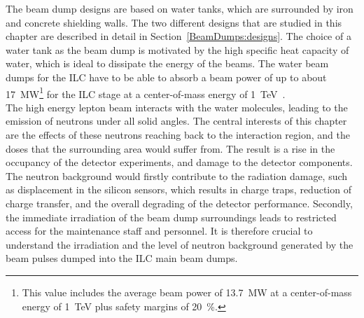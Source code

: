 The beam dump designs are based on water tanks, which are surrounded by iron and concrete shielding walls. 
The two different designs that are studied in this chapter are described in detail in Section~\ref{BeamDumps:designs}.
The choice of a water tank as the beam dump is motivated by the high specific heat capacity of water, which is ideal to dissipate the energy of the beams. 
The water beam dumps for the ILC have to be able to absorb a beam power of up to about \SI{17}{\mega\watt}\footnote{This value includes the average beam power of \SI{13.7}{\mega\watt} at a center-of-mass energy of \SI{1}{\TeV} plus safety margins of \SI{20}{\percent}.} for the ILC stage at a center-of-mass energy of \SI{1}{\TeV}~\cite{BeamDumpSpecs}.
\\The high energy lepton beam interacts with the water molecules, leading to the emission of neutrons under all solid angles. 
The central interests of this chapter are the effects of these neutrons reaching back to the interaction region, and the doses that the surrounding area would suffer from. 
The result is a rise in the occupancy of the detector experiments, and damage to the detector components.
The neutron background would firstly contribute to the radiation damage, such as displacement in the silicon sensors, which results in charge traps, reduction of charge transfer, and the overall degrading of the detector performance. 
Secondly, the immediate irradiation of the beam dump surroundings leads to restricted access for the maintenance staff and personnel.
It is therefore crucial to understand the irradiation and the level of neutron background generated by the beam pulses dumped into the ILC main beam dumps.

